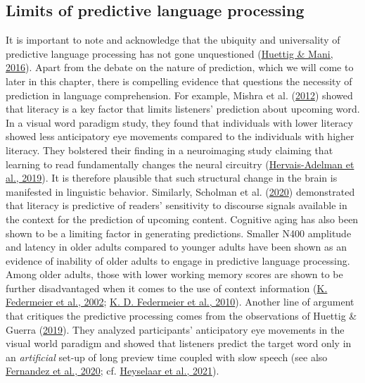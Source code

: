 \documentclass[a4paper, nobind]{templates/ociamthesis}
\begin{document}
\hypertarget{limits-of-pp}{%
\subsection{Limits of predictive language processing}\label{limits-of-pp}}

It is important to note and acknowledge that the ubiquity and universality of predictive language processing has not gone unquestioned (\protect\hyperlink{ref-Huettig2016}{Huettig \& Mani, 2016}).
Apart from the debate on the nature of prediction, which we will come to later in this chapter, there is compelling evidence that questions the necessity of prediction in language comprehension.
For example, Mishra et al. (\protect\hyperlink{ref-Mishra2012}{2012}) showed that literacy is a key factor that limits listeners' prediction about upcoming word.
In a visual word paradigm study, they found that individuals with lower literacy showed less anticipatory eye movements compared to the individuals with higher literacy.
They bolstered their finding in a neuroimaging study claiming that learning to read fundamentally changes the neural circuitry (\protect\hyperlink{ref-Hervais2019}{Hervais-Adelman et al., 2019}).
It is therefore plausible that such structural change in the brain is manifested in linguistic behavior.
Similarly, Scholman et al. (\protect\hyperlink{ref-Scholman2020}{2020}) demonstrated that literacy is predictive of readers' sensitivity to discourse signals available in the context for the prediction of upcoming content.
Cognitive aging has also been shown to be a limiting factor in generating predictions.
Smaller N400 amplitude and latency in older adults compared to younger adults have been shown as an evidence of inability of older adults to engage in predictive language processing.
Among older adults, those with lower working memory scores are shown to be further disadvantaged when it comes to the use of context information (\protect\hyperlink{ref-Federmeier2002}{K. Federmeier et al., 2002}; \protect\hyperlink{ref-Federmeier2010}{K. D. Federmeier et al., 2010}).
Another line of argument that critiques the predictive processing comes from the observations of Huettig \& Guerra (\protect\hyperlink{ref-Huettig2019}{2019}).
They analyzed participants' anticipatory eye movements in the visual world paradigm and showed that listeners predict the target word only in an \emph{artificial} set-up of long preview time coupled with slow speech (see also \protect\hyperlink{ref-Fernandez2020}{Fernandez et al., 2020}; cf. \protect\hyperlink{ref-Heyselaar2021}{Heyselaar et al., 2021}).
\end{document}
